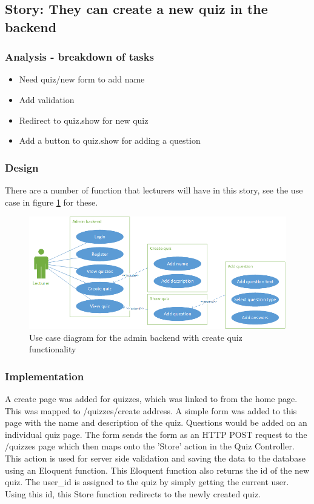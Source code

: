 \subsection{Story: They can create a new quiz in the backend}
\subsubsection{Analysis - breakdown of tasks}
\begin{itemize}
	\item Need quiz/new form to add name
	\item Add validation
	\item Redirect to quiz.show for new quiz
	\item Add a button to quiz.show for adding a question
\end{itemize}
\subsubsection{Design}
There are a number of function that lecturers will have in this story, see the use case in figure \ref{fig:quiz-create-use-case} for these.
\begin{figure}
	\caption{Use case diagram for the admin backend with create quiz functionality}
	\centerline{\includegraphics{Chapter2/Iter-2/iter-2-use-case-create}}
	\label{fig:quiz-create-use-case}
\end{figure}
\subsubsection{Implementation}
A create page was added for quizzes, which was linked to from the home page. This was mapped to /quizzes/create address. A simple form was added to this page with the name and description of the quiz. Questions would be added on an individual quiz page. The form sends the form as an HTTP POST request to the /quizzes page which then maps onto the 'Store' action in the Quiz Controller. This action is used for server side validation and saving the data to the database using an Eloquent function. This Eloquent function also returns the id of the new quiz. The user\_id is assigned to the quiz by simply getting the current user. Using this id, this Store function redirects to the newly created quiz.

